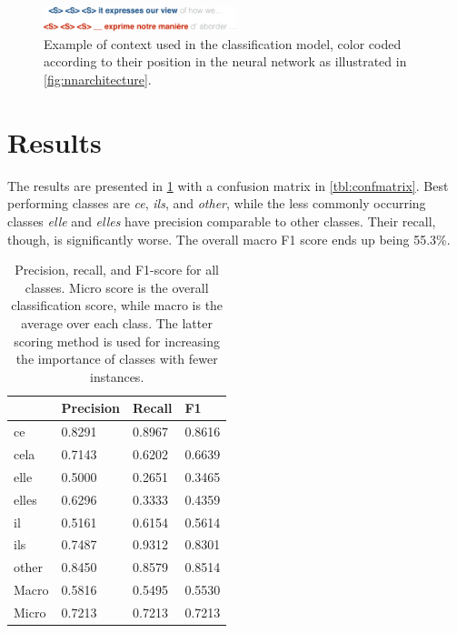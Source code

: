 \documentclass[11pt]{article}
\begin{document}
\begin{figure}[htbp]
    \centering
    \includegraphics[width=0.5\textwidth]{figures/contextexample.pdf}
    \caption{Example of context used in the classification model, color coded according to their position in the neural network as illustrated in \cref{fig:nnarchitecture}.}
    \label{fig:contextexample}
\end{figure}

\section{Results}

The results are presented in \cref{tbl:resultscores} with a confusion matrix in \cref{tbl:confmatrix}.
Best performing classes are \emph{ce}, \emph{ils}, and \emph{other}, while the less commonly occurring classes \emph{elle} and \emph{elles} have precision comparable to other classes.
Their recall, though, is significantly worse. The overall macro F1 score ends up being 55.3\%.

\begin{table}[t]
\center
    \begin{tabular}{llll}
          & Precision & Recall  & F1      \\ \midrule
    ce    & 0.8291   & 0.8967 & 0.8616 \\
    cela  & 0.7143   & 0.6202 & 0.6639 \\
    elle  & 0.5000   & 0.2651 & 0.3465 \\
    elles & 0.6296   & 0.3333 & 0.4359 \\
    il    & 0.5161   & 0.6154 & 0.5614 \\
    ils   & 0.7487   & 0.9312 & 0.8301 \\
    other & 0.8450   & 0.8579 & 0.8514 \\
    \midrule
    Macro & 0.5816 & 0.5495 & 0.5530 \\
    Micro & 0.7213 & 0.7213 & 0.7213 \\
    \hline
    \end{tabular}
    \caption{Precision, recall, and F1-score for all classes. Micro score is the overall classification score, while macro is the average over each class. The latter scoring method is used for increasing the importance of classes with fewer instances.}
    \label{tbl:resultscores}
\end{table}
\end{document}
